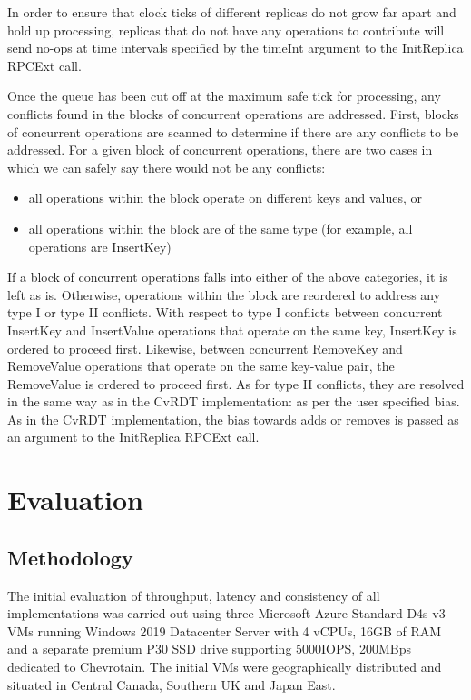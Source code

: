 \documentclass[sigconf,nonacm,10pt]{acmart}
\begin{document}
In order to ensure that clock ticks of different replicas do not grow far apart and hold up processing, replicas that do not have any operations to contribute will send no-ops at time intervals specified by the timeInt argument to the InitReplica RPCExt call.

Once the queue has been cut off at the maximum safe tick for processing, any conflicts found in the blocks of concurrent operations are addressed. First, blocks of concurrent operations are scanned to determine if there are any conflicts to be addressed. For a given block of concurrent operations, there are two cases in which we can safely say there would not be any conflicts:
\begin{itemize}
 \item all operations within the block operate on different keys and values, or
 \item all operations within the block are of the same type (for example, all operations are InsertKey)
\end{itemize}

If a block of concurrent operations falls into either of the above categories, it is left as is. Otherwise, operations within the block are reordered to address any type I or type II conflicts. With respect to type I conflicts between concurrent InsertKey and InsertValue operations that operate on the same key, InsertKey is ordered to proceed first. Likewise, between concurrent RemoveKey and RemoveValue operations that operate on the same key-value pair, the RemoveValue is ordered to proceed first. As for type II conflicts, they are resolved in the same way as in the CvRDT implementation: as per the user specified bias. As in the CvRDT implementation, the bias towards adds or removes is passed as an argument to the InitReplica RPCExt call.

\section{Evaluation}
\subsection{Methodology}
The initial evaluation of throughput, latency and consistency of all implementations was carried out using three Microsoft Azure Standard D4s v3 VMs running Windows 2019 Datacenter Server with 4 vCPUs, 16GB of RAM and a separate premium P30 SSD drive supporting 5000IOPS, 200MBps dedicated to Chevrotain. The initial VMs were geographically distributed and situated in Central Canada, Southern UK and Japan East.
\end{document}
